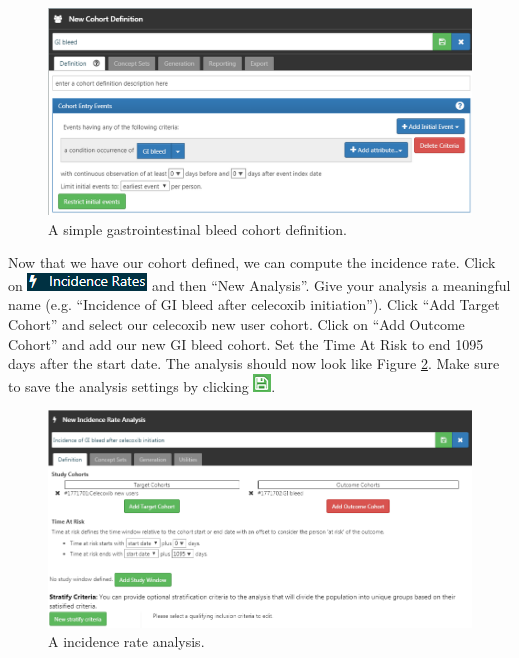 \documentclass[11pt]{book}
\theoremstyle{definition}
\theoremstyle{definition}
\theoremstyle{definition}
\theoremstyle{remark}
\begin{document}
\begin{figure}

{\centering \includegraphics[width=1\linewidth]{images/SuggestedAnswers/giBleedCohortDefinition} 

}

\caption{A simple gastrointestinal bleed cohort definition.}\label{fig:giBleedCohortDefinition}
\end{figure}

Now that we have our cohort defined, we can compute the incidence rate.
Click on
\includegraphics{images/Characterization/atlasIncidenceMenuItem.png} and
then ``New Analysis''. Give your analysis a meaningful name (e.g.
``Incidence of GI bleed after celecoxib initiation''). Click ``Add
Target Cohort'' and select our celecoxib new user cohort. Click on ``Add
Outcome Cohort'' and add our new GI bleed cohort. Set the Time At Risk
to end 1095 days after the start date. The analysis should now look like
Figure \ref{fig:irAnalysis}. Make sure to save the analysis settings by
clicking \includegraphics{images/Cohorts/save.png}.

\begin{figure}

{\centering \includegraphics[width=1\linewidth]{images/SuggestedAnswers/irAnalysis} 

}

\caption{A incidence rate analysis.}\label{fig:irAnalysis}
\end{figure}
\end{document}
